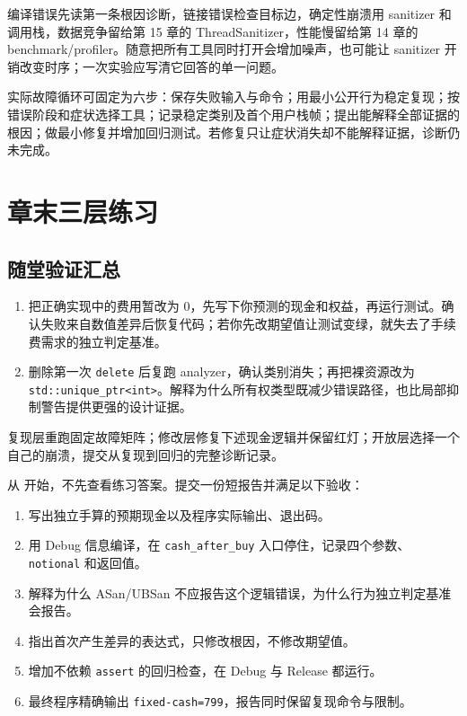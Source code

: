 编译错误先读第一条根因诊断，链接错误检查目标边，确定性崩溃用 sanitizer 和调用栈，数据竞争留给第 15 章的 ThreadSanitizer，性能慢留给第 14 章的 benchmark/profiler。随意把所有工具同时打开会增加噪声，也可能让 sanitizer 开销改变时序；一次实验应写清它回答的单一问题。

实际故障循环可固定为六步：保存失败输入与命令；用最小公开行为稳定复现；按错误阶段和症状选择工具；记录稳定类别及首个用户栈帧；提出能解释全部证据的根因；做最小修复并增加回归测试。若修复只让症状消失却不能解释证据，诊断仍未完成。

\section{章末三层练习}

\subsection*{随堂验证汇总}

\begin{enumerate}
  \item 把正确实现中的费用暂改为 0，先写下你预测的现金和权益，再运行测试。确认失败来自数值差异后恢复代码；若你先改期望值让测试变绿，就失去了手续费需求的独立判定基准。
  \item 删除第一次 \texttt{delete} 后复跑 analyzer，确认类别消失；再把裸资源改为 \texttt{std::unique\_ptr<int>}。解释为什么所有权类型既减少错误路径，也比局部抑制警告提供更强的设计证据。
\end{enumerate}

复现层重跑固定故障矩阵；修改层修复下述现金逻辑并保留红灯；开放层选择一个自己的崩溃，提交从复现到回归的完整诊断记录。

从  开始，不先查看练习答案。提交一份短报告并满足以下验收：

\begin{enumerate}
  \item 写出独立手算的预期现金以及程序实际输出、退出码。
  \item 用 Debug 信息编译，在 \texttt{cash\_after\_buy} 入口停住，记录四个参数、\texttt{notional} 和返回值。
  \item 解释为什么 ASan/UBSan 不应报告这个逻辑错误，为什么行为独立判定基准会报告。
  \item 指出首次产生差异的表达式，只修改根因，不修改期望值。
  \item 增加不依赖 \texttt{assert} 的回归检查，在 Debug 与 Release 都运行。
  \item 最终程序精确输出 \texttt{fixed-cash=799}，报告同时保留复现命令与限制。
\end{enumerate}

